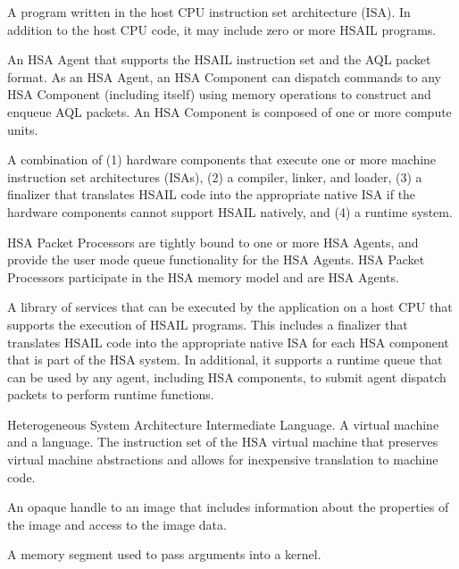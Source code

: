 \documentclass[final]{book}
\begin{document}
\begin{description}[itemsep=5pt,leftmargin=0cm, labelindent=0cm]
\item[HSA application] A program written in the host CPU instruction set
  architecture (ISA). In addition to the host CPU code, it may include zero or
  more HSAIL programs.

\item[HSA Component] An HSA Agent that supports the HSAIL instruction set and
  the AQL packet format. As an HSA Agent, an HSA Component can dispatch commands
  to any HSA Component (including itself) using memory operations to construct
  and enqueue AQL packets. An HSA Component is composed of one or more compute
  units.

\item[HSA implementation] A combination of (1) hardware components that execute
  one or more machine instruction set architectures (ISAs), (2) a compiler,
  linker, and loader, (3) a finalizer that translates HSAIL code into the
  appropriate native ISA if the hardware components cannot support HSAIL
  natively, and (4) a runtime system.

\item[HSA Packet Processor] HSA Packet Processors are tightly bound to one or
  more HSA Agents, and provide the user mode queue functionality for the HSA
  Agents. HSA Packet Processors participate in the HSA memory model and are HSA
  Agents.

\item[HSA runtime] A library of services that can be executed by the application
  on a host CPU that supports the execution of HSAIL programs. This includes a
  finalizer that translates HSAIL code into the appropriate native ISA for each
  HSA component that is part of the HSA system. In additional, it supports a
  runtime queue that can be used by any agent, including HSA components, to
  submit agent dispatch packets to perform runtime functions.

\item[HSAIL] Heterogeneous System Architecture Intermediate Language. A virtual
  machine and a language. The instruction set of the HSA virtual machine that
  preserves virtual machine abstractions and allows for inexpensive translation
  to machine code.

\item[Image handle] An opaque handle to an image that includes information about
  the properties of the image and access to the image data.

\item[Kernarg segment] A memory segment used to pass arguments into a kernel.


\end{description}
\end{document}
